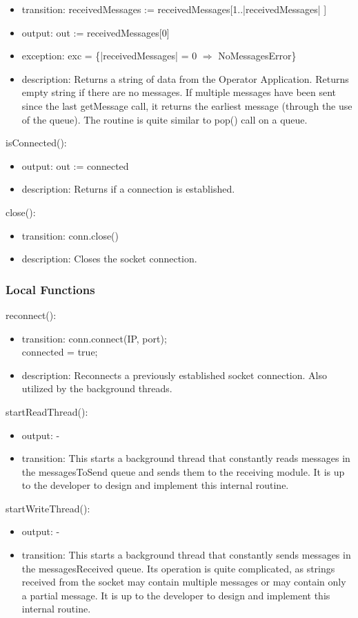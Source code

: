 \documentclass[12pt, titlepage]{article}
\begin{document}
\begin{itemize}
\item transition: receivedMessages := receivedMessages[1..|receivedMessages| ]
\item output: out := receivedMessages[0]
\item exception: exc = \{|receivedMessages| = 0 $\Rightarrow$ NoMessagesError\}
\item description: Returns a string of data from the Operator Application. Returns empty string if there are no messages. If multiple messages have been sent since the last getMessage call, it returns the earliest message (through the use of the queue). The routine is quite similar to pop() call on a queue.
\end{itemize}
\noindent isConnected():
\begin{itemize}
\item output: out := connected
\item description: Returns if a connection is established.
\end{itemize}
\noindent close():
\begin{itemize}
\item transition: conn.close()
\item description: Closes the socket connection. 
\end{itemize}
\subsubsection{Local Functions}
\noindent reconnect():
\begin{itemize}
\item transition: conn.connect(IP, port); \\ connected = true;
\item description: Reconnects a previously established socket connection. Also utilized by the background threads.
\end{itemize}
\noindent startReadThread():
\begin{itemize}
\item output: -
\item transition: This starts a background thread that constantly reads messages in the messagesToSend queue and sends them to the receiving module. It is up to the developer to design and implement this internal routine.
\end{itemize}
\noindent startWriteThread():
\begin{itemize}
\item output: -
\item transition: This starts a background thread that constantly sends messages in the  messagesReceived queue. Its operation is quite complicated, as strings received from the socket may contain multiple messages or may contain only a partial message. It is up to the developer to design and implement this internal routine.
\end{itemize}
\newpage
\end{document}
